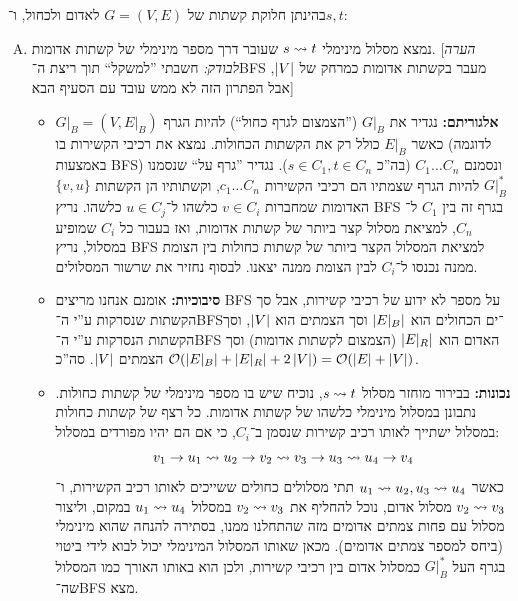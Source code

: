 \documentclass[]{../../../../tex/classes/homework}
\begin{document}
	\npage
	\section{}
	בהינתן חלוקת קשתות של $G = (V, E)$ לאדום ולכחול, ו־$s, t$: 
	\begin{enumerate}[A.]
		\item נמצא מסלול מינימלי $s \rightsquigarrow t$ שעובר דרך מספר מינימלי של קשתות אדומות. [\textit{הערה לבודק:} חשבתי ''למשקל`` תוך ריצת ה־BFS מעבר בקשתות אדומות כמרחק של $\left \lvert V \right \rvert$, אבל הפתרון הזה לא ממש עובד עם הסעיף הבא]
		\begin{itemize}
			\item \textbf{אלגוריתם: }נגדיר את $G|_B$ (''הצמצום לגרף כחול``) להיות הגרף $G|_B = (V, E|_B)$ כאשר $E|_B$ כולל רק את הקשתות הכחולות. נמצא את רכיבי הקשירות בו (לדוגמה באמצעות BFS) ונסמנם $C_1 \dots C_n$ (בה''כ $s \in C_1, t \in C_n$). נגדיר ''גרף על`` שנסמנו $G|_B^*$ להיות הגרף שצמתיו הם רכיבי הקשירות $c_1 \dots C_n$, וקשתותיו הן הקשתות $\{v, u\}$ האדומות שמחברות $v \in C_i$ כלשהו ל־$u \in C_{j}$ כלשהו. נריץ BFS בגרף זה בין $C_1$ ל־$C_n$, למציאת מסלול קצר ביותר של קשתות אדומות, ואז בעבור כל $C_i$ שמופיע במסלול, נריץ BFS למציאת המסלול הקצר ביותר של קשתות כחולות בין הצומת ממנה נכנסו ל־$C_i$ לבין הצומת ממנה יצאנו. לבסוף נחזיר את שרשור המסלולים. 
			
			\item \textbf{סיבוכיות: }אומנם אנחנו מריצים BFS על מספר לא ידוע של רכיבי קשירות, אבל סך הקשתות שנסרקות ע''י ה־BFS־ים הכחולים הוא $\left \lvert E|_B \right \rvert$ וסך הצמתים הוא $\left \lvert V \right \rvert$, וסך הקשתות הנסרקות ע''י ה־BFS האדום הוא $\left \lvert E|_R \right \rvert$ (הצמצום לקשתות אדומות) וסך הצמתים $\left \lvert V \right \rvert$. סה''כ $\mathcal{O}(\left \lvert E|_B \right \rvert + \left \lvert E|_R \right \rvert + 2\left \lvert V \right \rvert) = \mathcal{O}(\left \lvert E \right \rvert + \left \lvert V \right \rvert)$. 
			
			\item \textbf{נכונות: }בבירור מוחזר מסלול $s \rightsquigarrow t$, נוכיח שיש בו מספר מינימלי של קשתות כחולות. נתבונן במסלול מינימלי כלשהו של קשתות אדומות. כל רצף של קשתות כחולות במסלול ישתייך לאותו רכיב קשירות שנסמן ב־$C_i$, כי אם הם יהיו מפורדים במסלול: 
			\[ v_1 \to u_1 \rightsquigarrow u_2 \to v_2 \rightsquigarrow v_3 \to u_3 \rightsquigarrow u_4 \to v_4 \]
			כאשר $u_1 \rightsquigarrow u_2, u_3 \rightsquigarrow u_4$ תתי מסלולים כחולים ששייכים לאותו רכיב הקשירות, ו־$v_2 \rightsquigarrow v_3$ מסלול אדום, נוכל להחליף את $v_2 \rightsquigarrow v_3$ במסלול $u_1 \rightsquigarrow u_4$ במקום, וליצור מסלול עם פחות צמתים אדומים מזה שהתחלנו ממנו, בסתירה להנחה שהוא מינימלי (ביחס למספר צמתים אדומים). מכאן שאותו המסלול המינימלי יכול לבוא לידי ביטוי בגרף העל $G|_B^*$ כמסלול אדום בין רכיבי קשירות, ולכן הוא באותו האורך כמו המסלול שה־BFS מצא. 
		\end{itemize}
		

\end{enumerate}
\end{document}
